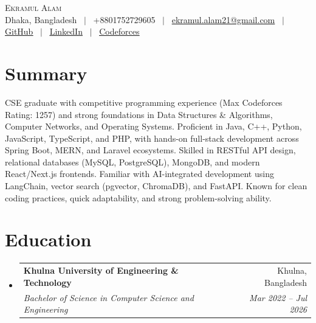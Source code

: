 \documentclass[letterpaper,10.5pt]{article}
\makeatletter
\newcommand{\resumeSubheading}[4]{
  \vspace{-2pt}\item
    \begin{tabular*}{\textwidth}[t]{l@{\extracolsep{\fill}}r}
      \textbf{#1} & #2 \\
      \textit{\small#3} & \textit{\small #4} \\
    \end{tabular*}\vspace{-7pt}
}
\newcommand{\resumeSubHeadingListStart}{\begin{itemize}[leftmargin=0.0in, label={}]}
\newcommand{\resumeSubHeadingListEnd}{\end{itemize}}
\makeatother
\begin{document}
\begin{center}
    {\Huge \scshape Ekramul Alam} \\ \vspace{4pt}
    \small Dhaka, Bangladesh ~$|$~ +8801752729605 ~$|$~
    \href{mailto:ekramul.alam21@gmail.com}{ekramul.alam21@gmail.com} ~$|$~
    \href{https://github.com/Apn7}{\underline{GitHub}} ~$|$~
    \href{https://www.linkedin.com/in/ekramul-alam-525659255/}{\underline{LinkedIn}} ~$|$~
    \href{https://codeforces.com/profile/Apn7}{\underline{Codeforces}}
    \vspace{-6pt}
\end{center}

\section{Summary}
\small{CSE graduate with competitive programming experience (Max Codeforces Rating: 1257) and strong foundations in Data Structures \& Algorithms, Computer Networks, and Operating Systems. Proficient in Java, C++, Python, JavaScript, TypeScript, and PHP, with hands-on full-stack development across Spring Boot, MERN, and Laravel ecosystems. Skilled in RESTful API design, relational databases (MySQL, PostgreSQL), MongoDB, and modern React/Next.js frontends. Familiar with AI-integrated development using LangChain, vector search (pgvector, ChromaDB), and FastAPI. Known for clean coding practices, quick adaptability, and strong problem-solving ability.}
\vspace{-4pt}

\section{Education}
  \resumeSubHeadingListStart
    \resumeSubheading
      {Khulna University of Engineering \& Technology}{Khulna, Bangladesh}
      {Bachelor of Science in Computer Science and Engineering}{Mar 2022 -- Jul 2026}
  \resumeSubHeadingListEnd
\vspace{-6pt}

\end{document}
